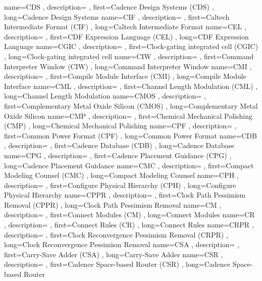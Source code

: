 { name={CDS}
, description={}
, first={Cadence Design Systems (CDS)}
, long={Cadence Design Systems}
}
{ name={CIF}
, description={}
, first={Caltech Intermediate Format (CIF)}
, long={Caltech Intermediate Format}
}
{ name={CEL}
, description={}
, first={CDF Expression Language (CEL)}
, long={CDF Expression Language}
}
{ name={CGIC}
, description={}
, first={Clock-gating integrated cell (CGIC)}
, long={Clock-gating integrated cell}
}
{ name={CIW}
, description={}
, first={Command Interpreter Window (CIW)}
, long={Command Interpreter Window}
}
{ name={CMI}
, description={}
, first={Compile Module Interface (CMI)}
, long={Compile Module Interface}
}
{ name={CML}
, description={}
, first={Channel Length Modulation (CML)}
, long={Channel Length Modulation}
}
{ name={CMOS}
, description={}
, first={Complementary Metal Oxide Silicon (CMOS)}
, long={Complementary Metal Oxide Silicon}
}
{ name={CMP}
, description={}
, first={Chemical Mechanical Polishing (CMP)}
, long={Chemical Mechanical Polishing}
}
{ name={CPF}
, description={}
, first={Common Power Format (CPF)}
, long={Common Power Format}
}
{ name={CDB}
, description={}
, first={Cadence Database (CDB)}
, long={Cadence Database}
}
{ name={CPG}
, description={}
, first={Cadence Placement Guidance (CPG)}
, long={Cadence Placement Guidance}
}
{ name={CMC}
, description={}
, first={Compact Modeling Counsel (CMC)}
, long={Compact Modeling Counsel}
}
{ name={CPH}
, description={}
, first={Configure Physical Hierarchy (CPH)}
, long={Configure Physical Hierarchy}
}
{ name={CPPR}
, description={}
, first={Clock Path Pessimism Removal (CPPR)}
, long={Clock Path Pessimism Removal}
}
{ name={CM}
, description={}
, first={Connect Modules (CM)}
, long={Connect Modules}
}
{ name={CR}
, description={}
, first={Connect Rules (CR)}
, long={Connect Rules}
}
{ name={CRPR}
, description={}
, first={Clock Reconvergence Pessimism Removal (CRPR)}
, long={Clock Reconvergence Pessimism Removal}
}
{ name={CSA}
, description={}
, first={Carry-Save Adder (CSA)}
, long={Carry-Save Adder}
}
{ name={CSR}
, description={}
, first={Cadence Space-based Router (CSR)}
, long={Cadence Space-based Router}
}
